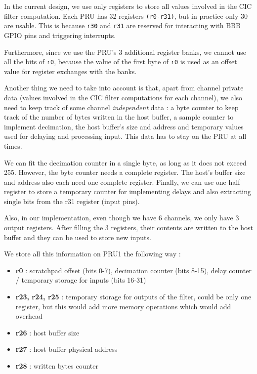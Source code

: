 \documentclass[]{report}
\providecommand{\tightlist}{%
	\setlength{\itemsep}{0pt}\setlength{\parskip}{0pt}}
\begin{document}
In the current design, we use only registers to store all values involved in the CIC filter computation. Each PRU has 32 registers \texttt{(r0-r31)}, but in practice only 30 are usable. This is because \texttt{r30} and \texttt{r31} are reserved for interacting with BBB GPIO pins and triggering interrupts.

Furthermore, since we use the PRU's 3 additional register banks, we cannot use all the bits of \texttt{r0}, because the value of the first byte of \texttt{r0} is used as an offset value for register exchanges with the banks.

Another thing we need to take into account is that, apart from channel private data (values involved in the CIC filter computations for each channel), we also need to keep track of some channel \textit{independent} data : a byte counter to keep track of the number of bytes written in the host buffer, a sample counter to implement decimation, the host buffer's size and address and temporary values used for delaying and processing input. This data has to stay on the PRU at all times.

We can fit the decimation counter in a single byte, as long as it does not exceed 255. However, the byte counter needs a complete register. The host's buffer size and address also each need one complete register. Finally, we can use one half register to store a temporary counter for implementing delays and also extracting single bits from the r31 register (input pins).

Also, in our implementation, even though we have 6 channels, we only have 3 output registers. After filling the 3 registers, their contents are written to the host buffer and they can be used to store new inputs.

We store all this information on PRU1 the following way :

\begin{itemize}
\tightlist
\item
  \textbf{r0} : scratchpad offset (bits 0-7), decimation counter (bits
  8-15), delay counter / temporary storage for inputs (bits 16-31)
\item
  \textbf{r23, r24, r25} : temporary storage for outputs of the filter,
  could be only one register, but this would add more memory operations
  which would add overhead
\item
  \textbf{r26} : host buffer size
\item
  \textbf{r27} : host buffer physical address
\item
  \textbf{r28} : written bytes counter
\end{itemize}
\end{document}
